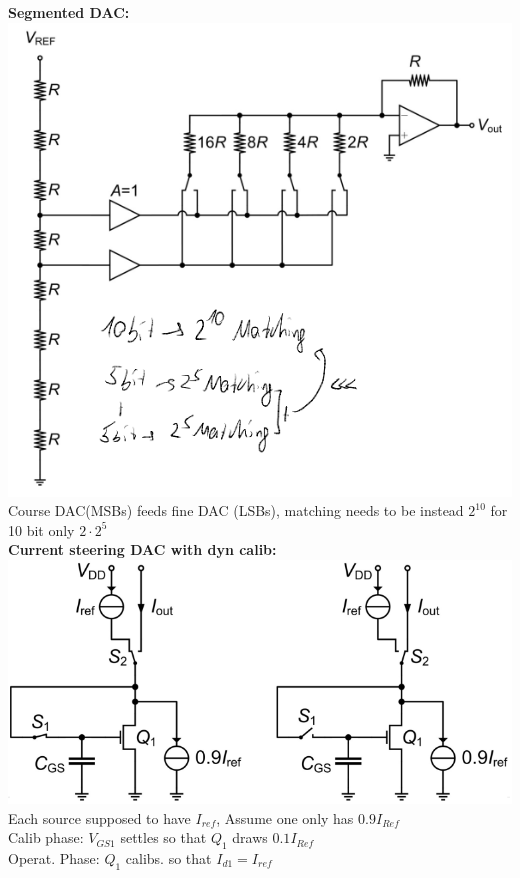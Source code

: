 \documentclass[5pt,landscape]{article}
\begin{document}
\begin{multicols*}{5}
\textbf{Segmented DAC:}\\
\includegraphics[width=\columnwidth]{images/dac_segemented.png}\\
Course DAC(MSBs) feeds fine DAC (LSBs), matching needs to be instead $ 2^10 $ for 10 bit only $ 2 \cdot 2^5 $\\
\textbf{Current steering DAC with dyn calib:}\\
\includegraphics[width=\columnwidth]{images/dac_auto_calib.png}\\
Each source supposed to have $ I_{ref} $, Assume one only has $ 0.9 I_{Ref} $\\
Calib phase: $ V_{GS1} $ settles so that $ Q_1 $ draws $ 0.1 I_{Ref} $\\
Operat. Phase: $ Q_1 $ calibs. so that $ I_{d1} = I_{ref} $













\end{multicols*}
\end{document}
